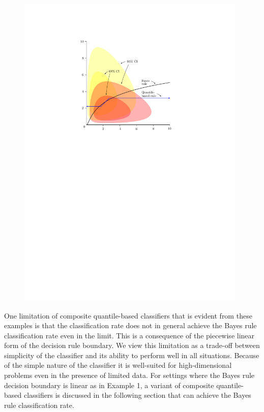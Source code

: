 \begin{figure}[ht]
\begin{minipage}[t]{0.49\linewidth}
    \includegraphics[width=0.975\textwidth]{gamma_cqc}
  \end{minipage}
\end{figure}

One limitation of composite quantile-based classifiers that is evident from
these examples is that the classification rate does not in general achieve the
Bayes rule classification rate even in the limit.  This is a consequence of the
piecewise linear form of the decision rule boundary.  We view this limitation as
a trade-off between simplicity of the classifier and its ability to perform well
in all situations.  Because of the simple nature of the classifier it is
well-suited for high-dimensional problems even in the presence of limited data.
For settings where the Bayes rule decision boundary is linear as in Example 1, a
variant of composite quantile-based classifiers is discussed in the following
section that can achieve the Bayes rule classification rate.


